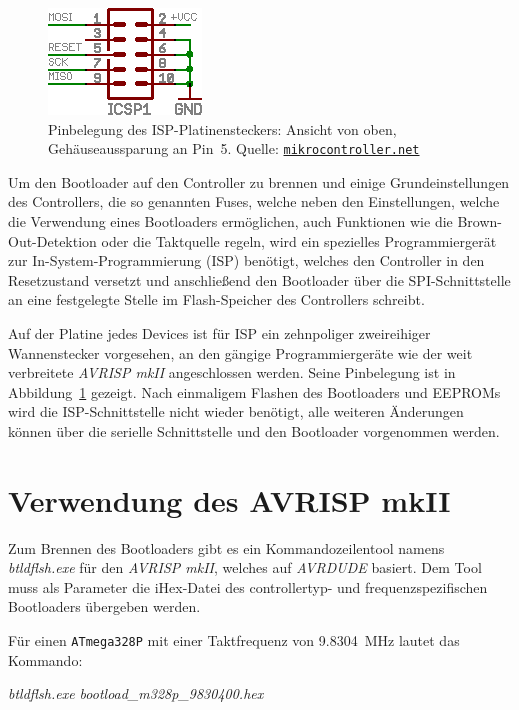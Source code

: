 \documentclass[paper=a4, parskip, numbers=noenddot, toc=listof, headsepline]{scrbook}
\begin{document}
		\begin{figure}[!h]
			\centering
			\includegraphics[width=.35\textwidth]{Bilder/isp}
			\caption{Pinbelegung des ISP-Platinensteckers: Ansicht von oben, Gehäuseaussparung an Pin~5. Quelle: \href{http://www.mikrocontroller.net}{\texttt{mikrocontroller.net}}}
			\label{fig:isp}
		\end{figure}

		Um den Bootloader auf den Controller zu brennen und einige Grundeinstellungen des Controllers, die so genannten Fuses, welche neben den Einstellungen, welche die Verwendung eines Bootloaders ermöglichen, auch Funktionen wie die Brown-Out-Detektion oder die Taktquelle regeln, wird ein spezielles Programmiergerät zur In-System-Programmierung (ISP) benötigt, welches den Controller in den Resetzustand versetzt und anschließend den Bootloader über die SPI-Schnittstelle an eine festgelegte Stelle im Flash-Speicher des Controllers schreibt.

		Auf der Platine jedes Devices ist für ISP ein zehnpoliger zweireihiger Wannenstecker vorgesehen, an den gängige Programmiergeräte wie der weit verbreitete \emph{AVRISP mkII} angeschlossen werden. Seine Pinbelegung ist in Abbildung~\ref{fig:isp} gezeigt. Nach einmaligem Flashen des Bootloaders und EEPROMs wird die ISP-Schnittstelle nicht wieder benötigt, alle weiteren Änderungen können über die serielle Schnittstelle und den Bootloader vorgenommen werden.

		\section{Verwendung des AVRISP mkII}

			Zum Brennen des Bootloaders gibt es ein Kommandozeilentool namens \emph{btldflsh.exe} für den \emph{AVRISP mkII}, welches auf \emph{AVRDUDE} basiert. Dem Tool muss als Parameter die iHex-Datei des controllertyp- und frequenzspezifischen Bootloaders übergeben werden.

			Für einen \texttt{ATmega328P} mit einer Taktfrequenz von \SI{9,8304}{\mega\hertz} lautet das Kommando:

			\begin{center}
				\emph{btldflsh.exe bootload\_m328p\_9830400.hex}
			\end{center}
\end{document}
